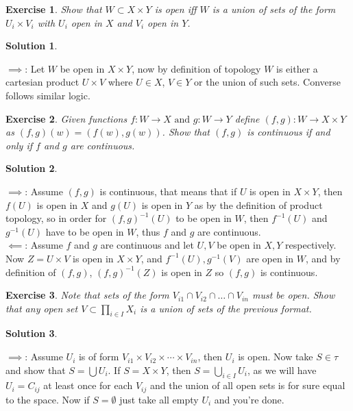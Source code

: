 \documentclass[11pt,a4paper]{article}
\newtheorem{Ex}{Exercise}
\newtheorem{Sol}{Solution}
\begin{document}
\begin{Ex}
	Show that $W \subset X \times Y$ is open iff $W$ is a union of sets of the form $U_i \times V_i$ with $U_i$ open in $X$ and $V_i$ open in $Y$.
\end{Ex}

\begin{Sol} \end{Sol}
\noindent $\implies$: Let $W$ be open in $X \times Y$, now by definition of topology $W$ is either a cartesian product $U \times V$ where $U \in X$, $V \in Y$ or the union of such sets. Converse follows similar logic.

\begin{Ex}
	Given functions $f: W \rightarrow X \text{ and } g: W \rightarrow Y$ define $(f,g): W \rightarrow X \times Y$ as $(f,g)(w)=(f(w),g(w))$. Show that $(f,g)$ is continuous if and only if $f$ and $g$ are continuous.  
\end{Ex} 
\begin{Sol} \end{Sol} 
\noindent $\implies$: Assume $(f,g)$ is continuous, that means that if $U$ is open in $X \times Y$, then $f(U)$ is open in $X$ and $g(U)$ is open in $Y$ as by the definition of product topology, so in order for $(f,g)^{-1}(U)$ to be open in $W$, then $f^{-1}(U)$ and $g^{-1}(U)$ have to be open in $W$, thus $f$ and $g$ are continuous. \\
\noindent $\impliedby$: Assume $f$ and $g$ are continuous and let $U, V$ be open in $X, Y$ respectively. Now $Z = U \times V$ is open in $X \times Y$, and $f^{-1}(U), g^{-1}(V)$ are open in $W$, and by definition of $(f,g)$, $(f,g)^{-1}(Z)$ is open in  $Z$ so $(f,g)$ is continuous.

\begin{Ex}
	Note that sets of the form $V_{i1} \cap V_{i2} \cap \dots \cap V_{in}$ must be open. Show that any open set $V \subset \prod_{i \in I}X_i$ is a union of sets of the previous format.
\end{Ex}  

\begin{Sol} \end{Sol} 
\noindent $\implies$: Assume $U_i$ is of form $V_{i1} \times V_{i2} \times \cdots \times V_{in}$, then $U_i$ is open. Now take $S \in \tau$ and show that $S = \bigcup U_i$. If $S = X \times Y$, then $S = \bigcup_{i \in I}U_i$, as we will have $U_i = C_{ij}$ at least once for each $V_{ij}$ and the union of all open sets is for sure equal to the space. Now if $S = \emptyset$ just take all empty $U_i$ and you're done.
\end{document}
